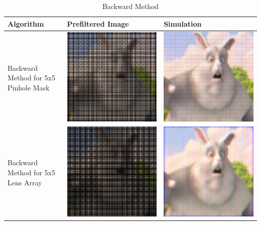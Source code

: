 \begin{table}[]
  \centering
     \caption{Backward Method}
    \begin{tabular}{| p{5 cm} | p{4cm} | p{4cm}  |}
    \hline Algorithm & Prefiltered Image & Simulation \\
    \hline Backward Method for 5x5 Pinhole Mask & \includegraphics[width = 4 cm]{chapters/chapter9/images/simulation_backward/pinhole/prefilterResult_5x5_pinhole_depth9.png} &
        \includegraphics[width = 4 cm]{chapters/chapter9/images/simulation_backward/pinhole/simulationResult_5x5_pinhole_depth9.png} \\
    \hline Backward Method for 5x5 Lens Array & \includegraphics[width = 4 cm]{chapters/chapter9/images/simulation_backward/lens/prefilterResult_5x5_lens_depth6.png} &
        \includegraphics[width = 4 cm]{chapters/chapter9/images/simulation_backward/lens/simulationResult_5x5_lens_depth6.png} \\

\end{tabular}
\end{table}
